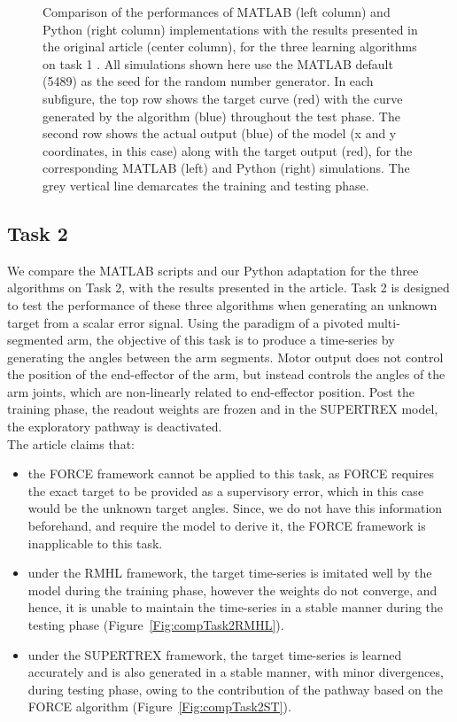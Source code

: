 \begin{figure}
\begin{subfigure}{\textwidth}
    \end{subfigure}


\caption{Comparison of the performances of MATLAB (left column) and Python (right column) implementations with the results presented in the original article (center column), for the three learning algorithms on task 1 \cite{pyle2019}. All simulations shown here use the MATLAB default (5489) as the seed for the random number generator. In each subfigure, the top row shows the target curve (red) with the curve generated by the algorithm (blue) throughout the test phase. The second row shows the actual output (blue) of the model (x and y coordinates, in this case) along with the target output (red), for the corresponding MATLAB (left) and Python (right) simulations. The grey vertical line demarcates the training and testing phase.}
\label{Fig:Comparison_Task1}

\end{figure}



\subsection{Task 2}

We compare the MATLAB scripts and our Python adaptation for the three algorithms on Task 2, with the results presented in the article. Task 2 is designed to test the performance of these three algorithms when generating an unknown target from a scalar error signal. Using the paradigm of a pivoted multi-segmented arm, the objective of this task is to produce a time‐series by generating the angles between the arm segments. Motor output does not control the position of the end-effector of the arm, but instead controls the angles of the arm joints, which are non-linearly related to end-effector position. Post the training phase, the readout weights are frozen and in the SUPERTREX model, the exploratory pathway is deactivated. \\

The article claims that:
\begin{itemize}
\item the FORCE framework cannot be applied to this task, as FORCE requires the exact target to be provided as a supervisory error, which in this case would be the unknown target angles. Since, we do not have this information beforehand, and require the model to derive it, the FORCE framework is inapplicable to this task.  
\item under the RMHL framework, the target time-series is imitated well by the model during the training phase, however the weights do not converge, and hence, it is unable to maintain the time-series in a stable manner during the testing phase (Figure~\ref{Fig:compTask2RMHL}).
\item under the SUPERTREX framework, the target time-series is learned accurately and is also generated in a stable manner, with minor divergences, during testing phase, owing to the contribution of the pathway based on the FORCE algorithm (Figure~\ref{Fig:compTask2ST}).
\end{itemize}

